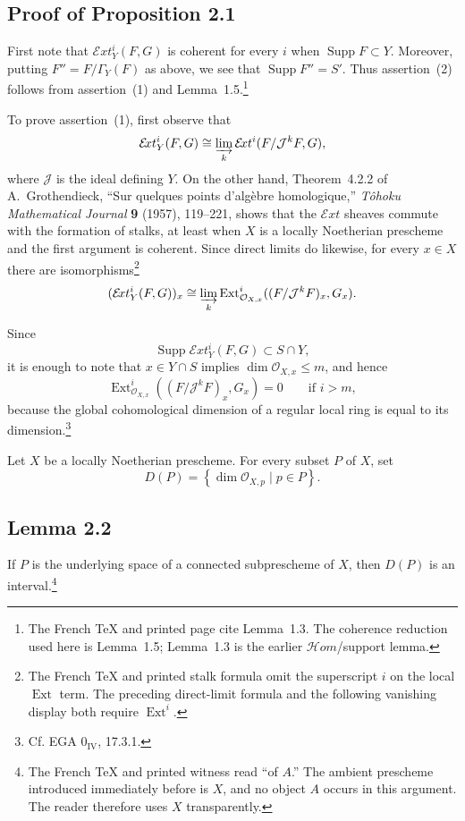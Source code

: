 \documentclass[11pt,a4paper]{article}
\newcommand{\Oo}{\mathcal O}
\newcommand{\SheafExt}{\mathcal E\!xt}
\newcommand{\Supp}{\operatorname{Supp}}
\newcommand{\Extop}{\operatorname{Ext}}
\newcommand{\Jj}{\mathcal J}
\begin{document}
\subsection*{Proof of Proposition 2.1}

First note that $\SheafExt_Y^i(F,G)$ is coherent for every $i$ when
$\Supp F\subset Y$. Moreover, putting $F''=F/\Gamma_Y(F)$ as above, we see
that $\Supp F''=S'$. Thus assertion~(2) follows from assertion~(1) and
Lemma~1.5.\footnote{The French TeX and printed page cite Lemma~1.3. The
coherence reduction used here is Lemma~1.5; Lemma~1.3 is the earlier
$\mathcal Hom$/support lemma.}

To prove assertion~(1), first observe that
\[
  \SheafExt_Y^i(F,G)\cong
  \varinjlim_k \SheafExt^i(F/\Jj^kF,G),
\]
where $\Jj$ is the ideal defining $Y$. On the other hand, Theorem~4.2.2 of
A.~Grothendieck, ``Sur quelques points d'alg\`ebre homologique,''
\emph{T\^ohoku Mathematical Journal} \textbf{9} (1957), 119--221, shows that
the $\SheafExt$ sheaves commute with the formation of stalks, at least when
$X$ is a locally Noetherian prescheme and the first argument is coherent.
Since direct limits do likewise, for every $x\in X$ there are
isomorphisms\footnote{The French TeX and printed stalk formula omit the
superscript $i$ on the local $\Extop$ term. The preceding direct-limit formula
and the following vanishing display both require $\Extop^i$.}
\[
  (\SheafExt_Y^i(F,G))_x\cong
  \varinjlim_k
  \Extop^i_{\Oo_{X,x}}((F/\Jj^kF)_x,G_x).
\]

Since
\[
  \Supp\SheafExt_Y^i(F,G)\subset S\cap Y,
\]
it is enough to note that $x\in Y\cap S$ implies
$\dim\Oo_{X,x}\leq m$, and hence
\[
  \Extop^i_{\Oo_{X,x}}((F/\Jj^kF)_x,G_x)=0
  \qquad\text{if }i>m,
\]
because the global cohomological dimension of a regular local ring is equal
to its dimension.\footnote{Cf. EGA $0_{\mathrm{IV}}$, 17.3.1.}

Let $X$ be a locally Noetherian prescheme. For every subset $P$ of $X$, set
\[
  D(P)=\left\{\dim\Oo_{X,p}\mid p\in P\right\}.
\]

\subsection*{Lemma 2.2}

If $P$ is the underlying space of a connected subprescheme of $X$, then
$D(P)$ is an interval.\footnote{The French TeX and printed witness read
``of $A$.'' The ambient prescheme introduced immediately before is $X$, and
no object $A$ occurs in this argument. The reader therefore uses $X$
transparently.}
\end{document}
